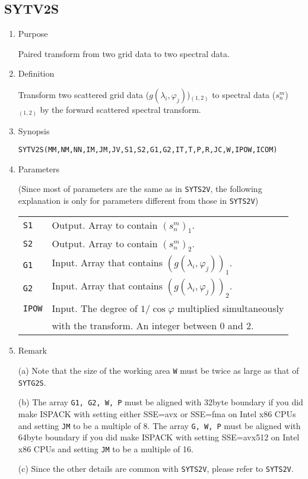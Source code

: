 \documentclass[a4paper]{scrartcl}
\begin{document}

\subsection{SYTV2S}

\begin{enumerate}

\item Purpose

Paired transform from two grid data to two spectral data.  

\item Definition

Transform two scattered grid data ($g(\lambda_i,\varphi_j)$)$_{(1,2)}$ 
to spectral data ($s^m_n$)$_{(1,2)}$ 
by the forward scattered spectral transform.

\item Synopsis 

\texttt{SYTV2S(MM,NM,NN,IM,JM,JV,S1,S2,G1,G2,IT,T,P,R,JC,W,IPOW,ICOM)}
  
\item Parameters

(Since most of parameters are the same as in \texttt{SYTS2V},
the following explanation is only for parameters
different from those in \texttt{SYTS2V})

\begin{tabular}{ll}
\texttt{S1} & Output. Array to contain $(s^m_n)_1$.\\
\texttt{S2} & Output. Array to contain $(s^m_n)_2$.\\  
\texttt{G1} & Input. Array that 
contains $(g(\lambda_i,\varphi_j))_1$.\\
\texttt{G2} & Input. Array that 
contains $(g(\lambda_i,\varphi_j))_2$.\\
\texttt{IPOW} & Input. 
The degree of $1/\cos\varphi$ multiplied 
simultaneously  \\
&  with the transform. An integer between 0 and 2.
\end{tabular}
  
\item Remark

(a) Note that the size of the working area \texttt{W} must
  be twice as large as that of \texttt{SYTG2S}.
  
(b) The array \texttt{G1, G2, W, P} must be aligned with 32byte boundary
if you did make ISPACK with setting either SSE=avx or SSE=fma
on Intel x86 CPUs and setting \texttt{JM} to be a multiple of 8.
The array \texttt{G, W, P} must be aligned with 64byte boundary
if you did make ISPACK with setting SSE=avx512
on Intel x86 CPUs and setting \texttt{JM} to be a multiple of 16.

(c) Since the other details are common with \texttt{SYTS2V},
  please refer to \texttt{SYTS2V}.
  
\end{enumerate}
\end{document}
